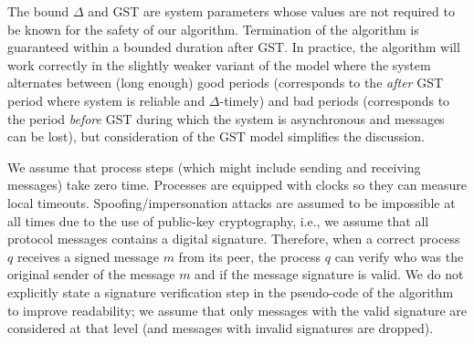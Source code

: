 The bound $\Delta$ and GST are system
parameters whose values are not required to be known for the safety of our
algorithm. Termination of the algorithm is guaranteed within a bounded duration
after GST.  In practice, the algorithm will work correctly in the slightly
weaker variant of the model where the system alternates between (long enough)
good periods (corresponds to the \emph{after} GST period where system is
reliable and $\Delta$-timely) and bad periods (corresponds to the period
\emph{before} GST during which the system is asynchronous and messages can be
lost), but consideration of the GST model simplifies the discussion.  

We assume that process steps (which might include sending and receiving
messages) take zero time.  Processes are equipped with clocks so they can
measure local timeouts.  
Spoofing/impersonation attacks are assumed to be impossible at all times due to
the use of public-key cryptography, i.e., we assume that all protocol messages contains a digital signature.
Therefore, when a correct
process $q$ receives a signed message $m$ from its peer, the process $q$ can
verify who was the original sender of the message $m$ and if the message signature is valid.
We do not explicitly state a signature verification step in the pseudo-code of the algorithm to improve readability;
we assume that only messages with the valid signature are considered at that level (and messages with invalid signatures
are dropped).  





